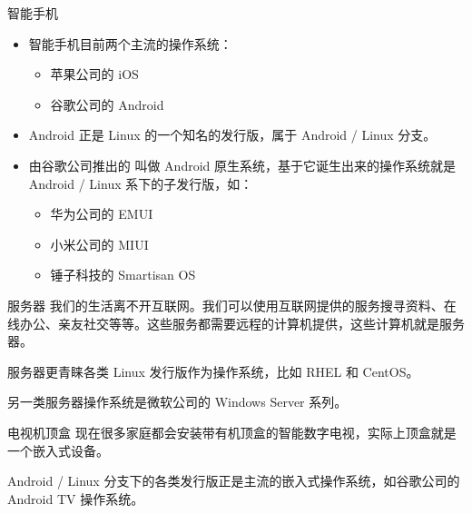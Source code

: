 \documentclass[UTF8]{ctexbeamer}
\begin{document}
\begin{frame}{智能手机}
    
    \begin{itemize}
        \item 智能手机目前两个主流的操作系统：
        \begin{itemize}
            \item 苹果公司的 iOS
            \item 谷歌公司的 Android
        \end{itemize}
        \item Android 正是 Linux 的一个知名的发行版，属于 Android / Linux 分支。
        \item 由谷歌公司推出的 叫做 Android 原生系统，基于它诞生出来的操作系统就是 Android / Linux 系下的子发行版，如：
        \begin{itemize}
            \item 华为公司的 EMUI
            \item 小米公司的 MIUI
            \item 锤子科技的 Smartisan OS
        \end{itemize}
    \end{itemize}
\end{frame}
\begin{frame}{服务器}
    我们的生活离不开互联网。我们可以使用互联网提供的服务搜寻资料、在线办公、亲友社交等等。这些服务都需要远程的计算机提供，这些计算机就是服务器。
    
    服务器更青睐各类 Linux 发行版作为操作系统，比如 RHEL 和 CentOS。
    
    另一类服务器操作系统是微软公司的 Windows Server 系列。
\end{frame}
\begin{frame}{电视机顶盒}
    现在很多家庭都会安装带有机顶盒的智能数字电视，实际上顶盒就是一个嵌入式设备。

    Android / Linux 分支下的各类发行版正是主流的嵌入式操作系统，如谷歌公司的 Android TV 操作系统。
\end{frame}
\end{document}
